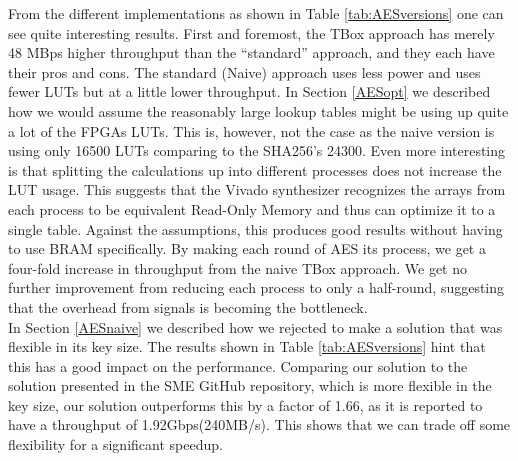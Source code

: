 \documentclass[a4paper, openany]{memoir}
\begin{document}
\begin{abstact}
From the different implementations as shown in Table \ref{tab:AESversions} one can see quite interesting results. First and foremost, the TBox approach has merely 48 MBps higher throughput than the ``standard'' approach, and they each have their pros and cons. The standard (Naive) approach uses less power and uses fewer LUTs but at a little lower throughput. In Section \ref{AESopt} we described how we would assume the reasonably large lookup tables might be using up quite a lot of the FPGAs LUTs. This is, however, not the case as the naive version is using only 16500 LUTs comparing to the SHA256's 24300. Even more interesting is that splitting the calculations up into different processes does not increase the LUT usage. This suggests that the Vivado synthesizer recognizes the arrays from each process to be equivalent Read-Only Memory and thus can optimize it to a single table. Against the assumptions, this produces good results without having to use BRAM specifically. By making each round of AES its process, we get a four-fold increase in throughput from the naive TBox approach. We get no further improvement from reducing each process to only a half-round, suggesting that the overhead from signals is becoming the bottleneck.\\
In Section \ref{AESnaive} we described how we rejected to make a solution that was flexible in its key size. The results shown in Table \ref{tab:AESversions} hint that this has a good impact on the performance. Comparing our solution to the solution presented in the SME GitHub repository, which is more flexible in the key size, our solution outperforms this by a factor of 1.66, as it is reported to have a throughput of 1.92Gbps(240MB/s)\cite{sme}. This shows that we can trade off some flexibility for a significant speedup.


\end{abstact}
\end{document}
